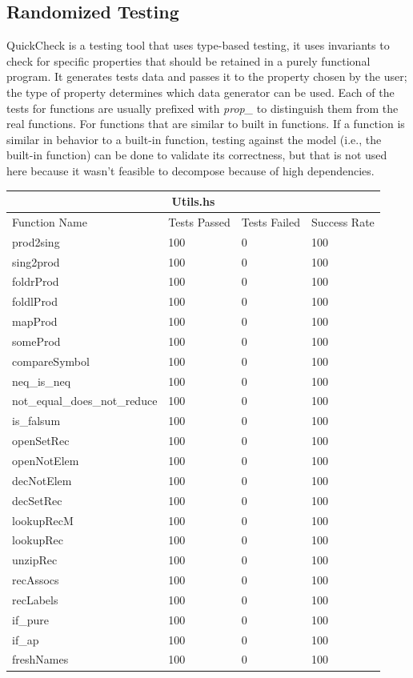 \documentclass[12pt, svgnames]{article}
\begin{document}
\subsection{Randomized Testing}
QuickCheck is a  testing tool that uses type-based testing, it uses invariants 
to check for specific properties that should be retained in a purely functional 
program. It generates tests data and passes it 
to the property chosen by the user; the type of property determines which data 
generator can be used. Each of the tests for functions are usually prefixed 
with \textit{prop\_} to distinguish them from the real functions. For functions 
that are similar to built in functions. If a function is similar in behavior 
to a built-in function, testing against the model (i.e., the built-in function) 
can be done to validate its correctness, but that is not used here because it wasn't feasible to decompose because of high dependencies.
\begin{adjustwidth}{-0.5cm}{}   
\begin{tabular}[h!]{ |p{5cm}||p{3cm}|p{3cm}|p{3cm}|  }
    \hline
    \multicolumn{4}{|c|}{Utils.hs} \\
    \hline
    Function Name & Tests Passed & Tests Failed & Success Rate\\
    \hline
    prod2sing   & 100    &0&   100\\
    sing2prod&   100  & 0   &100\\
    foldrProd &100 & 0&  100\\
    foldlProd &100 & 0&  100\\
    mapProd&   100  & 0&100\\
    someProd& 100  & 0   &100\\
    compareSymbol& 100  & 0&100\\
    neq\_is\_neq& 100  & 0&100\\
    not\_equal\_does\_not\_reduce& 100  & 0&100\\
    is\_falsum& 100  & 0&100\\
    openSetRec& 100  & 0&100\\
    openNotElem& 100  & 0&100\\
    decNotElem& 100  & 0&100\\
    decSetRec& 100  & 0&100\\
    lookupRecM& 100  & 0&100\\
    lookupRec& 100  & 0&100\\
    unzipRec& 100  & 0&100\\
    recAssocs& 100  & 0&100\\
    recLabels& 100  & 0&100\\
    if\_pure& 100  & 0&100\\
    if\_ap& 100  & 0&100\\
    freshNames& 100  & 0 &100\\
    \hline
\end{tabular}
\end{adjustwidth}
\end{document}
